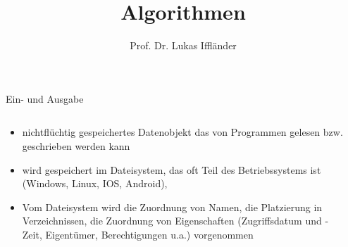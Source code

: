 \documentclass[xelatex,aspectratio=169]{beamer}
\title{Algorithmen}
\author{Prof. Dr. Lukas Iffländer}
\institute{HTW Dresden}
\date{}
\begin{document}
\begin{frame}{Ein- und Ausgabe}
    \begin{columns}
        \begin{column}{0.5\textwidth}
            \begin{itemize}
                \item nichtflüchtig gespeichertes Datenobjekt das von Programmen gelesen bzw. geschrieben werden kann
                \item wird gespeichert im Dateisystem, das oft Teil des Betriebssystems ist (Windows, Linux, IOS, Android),
                \item Vom Dateisystem wird die Zuordnung von Namen, die Platzierung in Verzeichnissen, die Zuordnung von Eigenschaften (Zugriffsdatum und -Zeit, Eigentümer, Berechtigungen u.a.) vorgenommen
            \end{itemize}
        \end{column}
        \begin{column}{0.5\textwidth}
        \end{column}
    \end{columns}


\end{frame}
\end{document}
